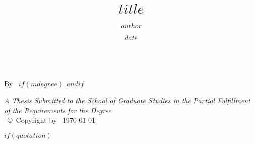 \documentclass[
11pt, %
oneside, %
english, %
singlespacing, %
]{macthesis} %
\title{$title$}
\author{$author$}
\date{$date$}
\def\blankpage{%
      \clearpage%
      \thispagestyle{empty}%
      \addtocounter{page}{-1}%
      \null%
      \clearpage}
\begin{document}
\sloppy

\frontmatter %

\pagestyle{plain} %

\vspace{6cm}
\begin{center}
\ttitle
\end{center}
\clearpage

\begin{center}

\vfill
\textsc{\Large \ttitle} \\

\vfill
{By \authorname\, \bdeg $if(mdegree)$\, \mdeg $endif$}


 \vfill
{\large \textit{A Thesis Submitted to the School of Graduate Studies in the Partial Fulfillment of the Requirements for the Degree \degreename}}\\

\vfill
{\large \univname\, \copyright\, Copyright by \authorname\, \today}\\[4cm] %

\end{center}
\blankpage
\clearpage


$if(quotation)$
\vspace*{0.2\textheight}

\bigbreak
\end{document}
